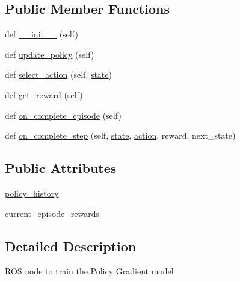 \subsection*{Public Member Functions}
\begin{DoxyCompactItemize}
\item 
def \hyperlink{classtrain__policy__gradient_1_1_policy_gradient_training_node_a556638d9dd7d0510dd7c89a41e8b5b8d}{\+\_\+\+\_\+init\+\_\+\+\_\+} (self)
\item 
def \hyperlink{classtrain__policy__gradient_1_1_policy_gradient_training_node_aa382b7c81d81d2c5a96b25dc32af26e4}{update\+\_\+policy} (self)
\item 
def \hyperlink{classtrain__policy__gradient_1_1_policy_gradient_training_node_af40b771234657aad44c5330949c2cfc5}{select\+\_\+action} (self, \hyperlink{classtraining__node_1_1_training_node_ab3ec26c96f6e4d86cd0be251d4fd1af4}{state})
\item 
def \hyperlink{classtrain__policy__gradient_1_1_policy_gradient_training_node_a4a52a270df93e79a5ee2d2b7c38d11b1}{get\+\_\+reward} (self)
\item 
def \hyperlink{classtrain__policy__gradient_1_1_policy_gradient_training_node_affd9de3766ea3a1f6da6acf9b05380c9}{on\+\_\+complete\+\_\+episode} (self)
\item 
def \hyperlink{classtrain__policy__gradient_1_1_policy_gradient_training_node_a5dff182b0e7f2edd41618ab84743d16b}{on\+\_\+complete\+\_\+step} (self, \hyperlink{classtraining__node_1_1_training_node_ab3ec26c96f6e4d86cd0be251d4fd1af4}{state}, \hyperlink{classtraining__node_1_1_training_node_a9aca91d2739de83e292f046f6047c193}{action}, reward, next\+\_\+state)
\end{DoxyCompactItemize}
\subsection*{Public Attributes}
\begin{DoxyCompactItemize}
\item 
\hyperlink{classtrain__policy__gradient_1_1_policy_gradient_training_node_a1368f6cbc79becb73b56808f656f2764}{policy\+\_\+history}
\item 
\hyperlink{classtrain__policy__gradient_1_1_policy_gradient_training_node_af6280f4d541ec29b5f3d046fe3201b30}{current\+\_\+episode\+\_\+rewards}
\end{DoxyCompactItemize}


\subsection{Detailed Description}
\begin{DoxyVerb}ROS node to train the Policy Gradient model
\end{DoxyVerb}
 

